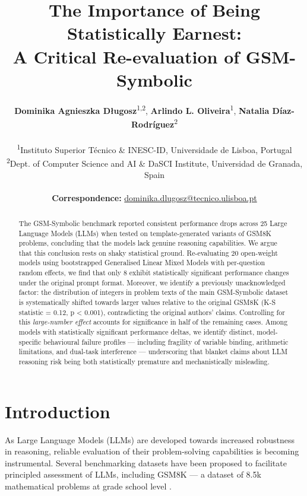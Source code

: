 \documentclass[11pt]{article}
\title{The Importance of Being Statistically Earnest:\\A Critical Re-evaluation of GSM-Symbolic}
\author{
  \textbf{Dominika Agnieszka D{\l}ugosz}\textsuperscript{1,2}, 
  \textbf{Arlindo L. Oliveira}\textsuperscript{1},  
  \textbf{Natalia D\'{i}az-Rodr\'{i}guez}\textsuperscript{2}
\\
\\
  \textsuperscript{1}Instituto Superior T\'{e}cnico \& INESC-ID, Universidade de Lisboa, Portugal\\
  \textsuperscript{2}Dept. of Computer Science and AI \& DaSCI Institute, Universidad de Granada, Spain\\
\\
  \small{\textbf{Correspondence:} \href{mailto:dominika.dlugosz@tecnico.ulisboa.pt}{dominika.dlugosz@tecnico.ulisboa.pt}}
}
\begin{document}
\maketitle
\begin{abstract}
The GSM-Symbolic benchmark \citep{mirzadeh2025gsm} reported consistent performance drops across 25 Large Language Models (LLMs) when tested on template-generated variants of GSM8K problems, concluding that the models lack genuine reasoning capabilities. We argue that this conclusion rests on shaky statistical ground. Re-evaluating 20 open-weight models using bootstrapped Generalised Linear Mixed Models with per-question random effects, we find that only 8 exhibit statistically significant performance changes under the original prompt format. Moreover, we identify a previously unacknowledged factor: the distribution of integers in problem texts of the main GSM-Symbolic dataset is systematically shifted towards larger values relative to the original GSM8K (K-S statistic = 0.12, p < 0.001), contradicting the original authors' claims. Controlling for this \textit{large-number effect} accounts for significance in half of the remaining cases. Among models with statistically significant performance deltas, we identify distinct, model-specific behavioural failure profiles --- including fragility of variable binding, arithmetic limitations, and dual-task interference --- underscoring that blanket claims about LLM reasoning risk being both statistically premature and mechanistically misleading.

\end{abstract}

\section{Introduction}

As Large Language Models (LLMs) are developed towards increased robustness in reasoning, reliable evaluation of their problem-solving capabilities is becoming instrumental. Several benchmarking datasets have been proposed to facilitate principled assessment of LLMs, including GSM8K --- a dataset of 8.5k mathematical problems at grade school level \citep{cobbe2021gsm8k}.
\end{document}
